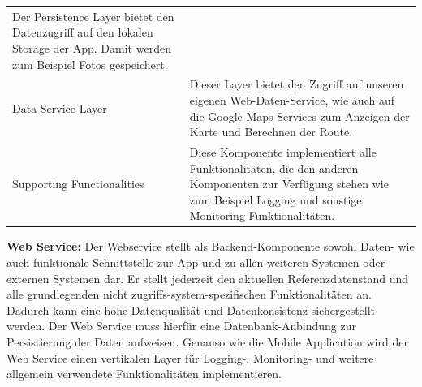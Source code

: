 \documentclass[ngerman,]{article}
\begin{document}
\begin{longtable}[]{@{}ll@{}}
\begin{minipage}[t]{0.86\columnwidth}
Der Persistence Layer bietet den Datenzugriff auf den lokalen Storage
der App. Damit werden zum Beispiel Fotos gespeichert.\strut
\end{minipage}\tabularnewline
\begin{minipage}[t]{0.08\columnwidth}\raggedright\strut
Data Service Layer\strut
\end{minipage} & \begin{minipage}[t]{0.86\columnwidth}\raggedright\strut
Dieser Layer bietet den Zugriff auf unseren eigenen Web-Daten-Service,
wie auch auf die Google Maps Services zum Anzeigen der Karte und
Berechnen der Route.\strut
\end{minipage}\tabularnewline
\begin{minipage}[t]{0.08\columnwidth}\raggedright\strut
Supporting Functionalities\strut
\end{minipage} & \begin{minipage}[t]{0.86\columnwidth}\raggedright\strut
Diese Komponente implementiert alle Funktionalitäten, die den anderen
Komponenten zur Verfügung stehen wie zum Beispiel Logging und sonstige
Monitoring-Funktionalitäten.\strut
\end{minipage}\tabularnewline
\bottomrule
\end{longtable}

\textbf{Web Service:} Der Webservice stellt als Backend-Komponente
sowohl Daten- wie auch funktionale Schnittstelle zur App und zu allen
weiteren Systemen oder externen Systemen dar. Er stellt jederzeit den
aktuellen Referenzdatenstand und alle grundlegenden nicht
zugriffs-system-spezifischen Funktionalitäten an. Dadurch kann eine hohe
Datenqualität und Datenkonsistenz sichergestellt werden. Der Web Service
muss hierfür eine Datenbank-Anbindung zur Persistierung der Daten
aufweisen. Genauso wie die Mobile Application wird der Web Service einen
vertikalen Layer für Logging-, Monitoring- und weitere allgemein
verwendete Funktionalitäten implementieren.
\end{document}

